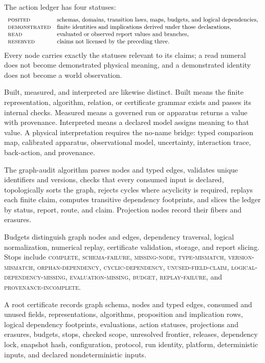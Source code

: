 The action ledger has four statuses:
\[
\begin{array}{ll}
\textsc{posited}&\text{schemas, domains, transition laws, maps, budgets, and logical dependencies},\\
\textsc{demonstrated}&\text{finite identities and implications derived under those declarations},\\
\textsc{read}&\text{evaluated or observed report values and branches},\\
\textsc{reserved}&\text{claims not licensed by the preceding three}.
\end{array}
\]
Every node carries exactly the statuses relevant to its claims; a read numeral does not become demonstrated physical
meaning, and a demonstrated identity does not become a world observation.

Built, measured, and interpreted are likewise distinct.  Built means the finite representation, algorithm, relation,
or certificate grammar exists and passes its internal checks.  Measured means a governed run or apparatus returns a
value with provenance.  Interpreted means a declared model assigns meaning to that value.  A physical interpretation
requires the no-name bridge: typed comparison map, calibrated apparatus, observational model, uncertainty, interaction
trace, back-action, and provenance.

The graph-audit algorithm parses nodes and typed edges, validates unique identifiers and versions, checks that every
consumed input is declared, topologically sorts the graph, rejects cycles where acyclicity is required, replays each
finite claim, computes transitive dependency footprints, and slices the ledger by status, report, route, and claim.
Projection nodes record their fibers and erasures.

Budgets distinguish graph nodes and edges, dependency traversal, logical normalization, numerical replay, certificate
validation, storage, and report slicing.  Stops include \textsc{complete}, \textsc{schema-failure},
\textsc{missing-node}, \textsc{type-mismatch}, \textsc{version-mismatch}, \textsc{orphan-dependency},
\textsc{cyclic-dependency}, \textsc{unused-field-claim}, \textsc{logical-dependency-missing},
\textsc{evaluation-missing}, \textsc{budget}, \textsc{replay-failure}, and
\textsc{provenance-incomplete}.

A root certificate records graph schema, nodes and typed edges, consumed and unused fields, representations,
algorithms, proposition and implication rows, logical dependency footprints, evaluations, action statuses, projections
and erasures, budgets, stops, checked scope, unresolved frontier, releases, dependency lock, snapshot hash,
configuration, protocol, run identity, platform, deterministic inputs, and declared nondeterministic inputs.

